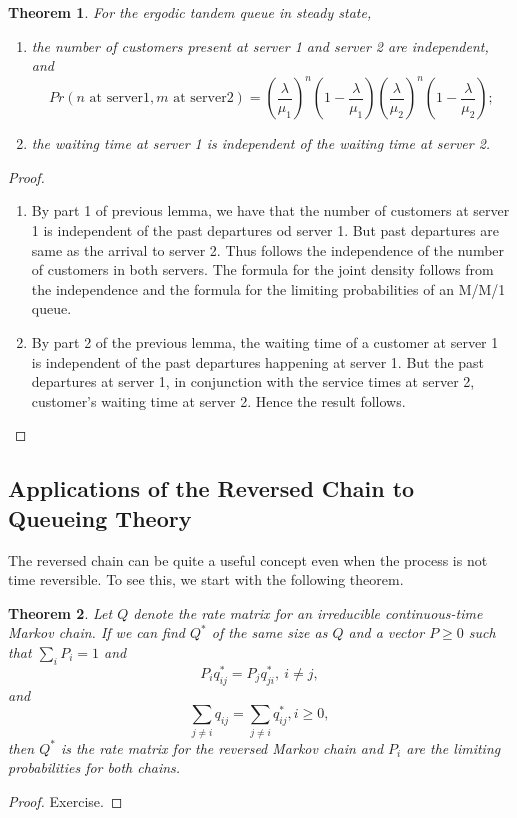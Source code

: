 \documentclass[a4paper,10pt]{article}
\theoremstyle{plain}
\newtheorem{thm}{Theorem}[section]
\theoremstyle{definition}
\theoremstyle{remark}
\begin{document}
\begin{thm}
For the ergodic tandem queue in steady state,
\begin{enumerate}
\item the number of customers present at server 1 and server 2 are independent, and
\begin{equation*}
Pr(n \text{~at server}1, m \text{~at server}2)={(\frac{\lambda}{\mu_1})}^n(1-\frac{\lambda}{\mu_1}){(\frac{\lambda}{\mu_2})}^n(1-\frac{\lambda}{\mu_2});
\end{equation*}
\item the waiting time at server 1 is independent of the waiting time at server 2.
\end{enumerate}
\end{thm}
\begin{proof}
\begin{enumerate}
\item By part 1 of previous lemma, we have that the number of customers at server 1 is independent of the past departures od server 1. But past departures are same as the arrival to server 2. Thus follows the independence of the number of customers in both servers. The formula for the joint density follows from the independence and the formula for the limiting probabilities of an M/M/1 queue. 
\item By part 2 of the previous lemma, the waiting time of a customer at server 1 is independent of the past departures happening at server 1. But the past departures at server 1, in conjunction with the service times at server 2, customer's waiting time at server 2. Hence the result follows.
\end{enumerate}
\end{proof}
\subsection{Applications of the Reversed Chain to Queueing Theory}
The reversed chain can be quite a useful concept even when the process is not time reversible. To see this, we start with the following theorem. 
\begin{thm}
Let $Q$ denote the rate matrix for an irreducible continuous-time Markov chain. If we can find $Q^*$ of the same size as $Q$ and a vector $P \geq 0$ such that $\sum_i P_i =1$ and 
\begin{equation*}
P_{i}q_{ij}^*=P_jq_{ji}^*, ~ i \neq j,
\end{equation*} and
\begin{equation*}
\sum_{j \neq i}q_{ij}=\sum_{j \neq i}q_{ij}^*, i \geq 0,
\end{equation*} 
then $Q^*$ is the rate matrix for the reversed Markov chain and $P_i$ are the limiting probabilities for both  chains.
\end{thm}
\begin{proof}
Exercise.
\end{proof}
\end{document}
